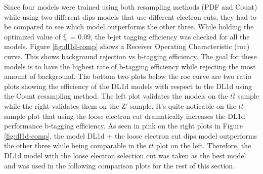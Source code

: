 Since four models were trained using both resampling methods (PDF and Count) while using two different \gls{dips} models that use different electron cuts, they had to be compared to see which 
model outperforms the other three. While holding the optimized value of $\textrm{f}_{\textrm{c}}$ = 0.09, the b-jet tagging efficiency was checked for all the models. Figure \ref{fig:dl1d-comp} shows a Receiver Operating Characteristic (\gls{roc}) curve. This shows background rejection vs b-tagging efficiency. The goal for these models is to have the highest rate of b-tagging efficiency while 
rejecting the most amount of background. The bottom two plots below the \gls{roc} curve are two ratio plots showing the efficiency of the DL1d models with respect to the DL1d using the Count 
resampling method. The left plot validates the models on the $t\bar{t}$ sample while the right validates them on the $\textrm{Z}'$ sample. It's quite noticable on the $t\bar{t}$ sample plot that 
using the loose electron cut dramatically increases the DL1d performance b-tagging efficiency. As seen in pink on the right plots in Figure \ref{fig:dl1d-comp}, the model DL1d + the loose electron cut \gls{dips} 
model outperforms the other three while being comparable in the $t\bar{t}$ plot on the left. Therefore, the DL1d model with the loose electron selection cut was taken as the best model and was used 
in the following comparison plots for the rest of this section.

